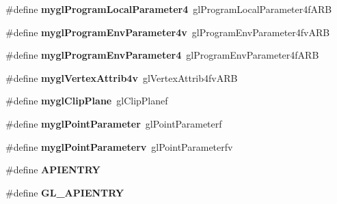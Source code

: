 \begin{DoxyCompactItemize}
\item 
\hypertarget{group___a_p_i___o_g_l_e_s_ga5a2699513db227f20b86d34e2bd1985c}{\#define {\bfseries mygl\+Program\+Local\+Parameter4}~gl\+Program\+Local\+Parameter4f\+A\+R\+B}\label{group___a_p_i___o_g_l_e_s_ga5a2699513db227f20b86d34e2bd1985c}

\item 
\hypertarget{group___a_p_i___o_g_l_e_s_ga52f8117d21960fafbb9a112be2e0602b}{\#define {\bfseries mygl\+Program\+Env\+Parameter4v}~gl\+Program\+Env\+Parameter4fv\+A\+R\+B}\label{group___a_p_i___o_g_l_e_s_ga52f8117d21960fafbb9a112be2e0602b}

\item 
\hypertarget{group___a_p_i___o_g_l_e_s_gaf4055966700c81c81b0c4e78ce79f2c9}{\#define {\bfseries mygl\+Program\+Env\+Parameter4}~gl\+Program\+Env\+Parameter4f\+A\+R\+B}\label{group___a_p_i___o_g_l_e_s_gaf4055966700c81c81b0c4e78ce79f2c9}

\item 
\hypertarget{group___a_p_i___o_g_l_e_s_gaa918a27fd8609ad92d40f254ec77b5cd}{\#define {\bfseries mygl\+Vertex\+Attrib4v}~gl\+Vertex\+Attrib4fv\+A\+R\+B}\label{group___a_p_i___o_g_l_e_s_gaa918a27fd8609ad92d40f254ec77b5cd}

\item 
\hypertarget{group___a_p_i___o_g_l_e_s_gaf0f86a98a7f61dd27ade59ed5918d35b}{\#define {\bfseries mygl\+Clip\+Plane}~gl\+Clip\+Planef}\label{group___a_p_i___o_g_l_e_s_gaf0f86a98a7f61dd27ade59ed5918d35b}

\item 
\hypertarget{group___a_p_i___o_g_l_e_s_ga617ab61f1e0a27af9bdab3c16fa2bfc5}{\#define {\bfseries mygl\+Point\+Parameter}~gl\+Point\+Parameterf}\label{group___a_p_i___o_g_l_e_s_ga617ab61f1e0a27af9bdab3c16fa2bfc5}

\item 
\hypertarget{group___a_p_i___o_g_l_e_s_ga31948a4db433b1eb20f4452443c32faf}{\#define {\bfseries mygl\+Point\+Parameterv}~gl\+Point\+Parameterfv}\label{group___a_p_i___o_g_l_e_s_ga31948a4db433b1eb20f4452443c32faf}

\item 
\hypertarget{group___a_p_i___o_g_l_e_s_ga428a91acf2c2439dc1a257708ee1f805}{\#define {\bfseries A\+P\+I\+E\+N\+T\+R\+Y}}\label{group___a_p_i___o_g_l_e_s_ga428a91acf2c2439dc1a257708ee1f805}

\item 
\hypertarget{group___a_p_i___o_g_l_e_s_ga7a364076ac927b6b486258d0a8dbeb84}{\#define {\bfseries G\+L\+\_\+\+A\+P\+I\+E\+N\+T\+R\+Y}}\label{group___a_p_i___o_g_l_e_s_ga7a364076ac927b6b486258d0a8dbeb84}


\end{DoxyCompactItemize}
